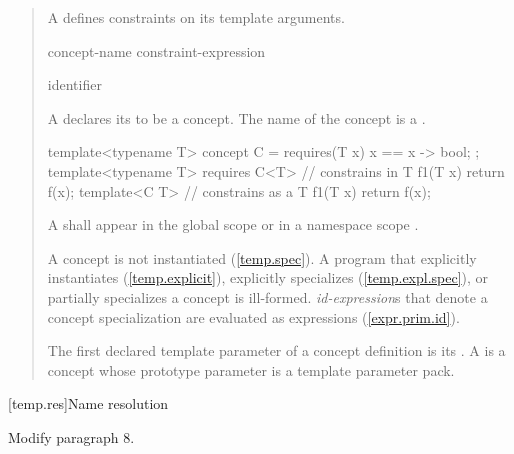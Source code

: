 \begin{quote}
\begin{addedblock}
\pnum A  defines constraints on its template arguments.

\begin{bnf}
\br
   concept-name \terminal{=} constraint-expression\br
\end{bnf}
\begin{bnf}
\br
  identifier
\end{bnf}

\pnum A  declares its 
to be a concept. The name of the concept is a .
\enterexample
\begin{codeblock}
template<typename T>
concept C = requires(T x) {
  { x == x } -> bool;
};
template<typename T> 
  requires C<T> //  constrains  in 
T f1(T x) { return f(x); }
template<C T> //  constrains  as a 
T f1(T x) { return f(x); }
\end{codeblock}
\exitexample

\pnum
A  shall appear in the global scope or in a
namespace scope .

\pnum
A concept is not instantiated (\ref{temp.spec}). 
A program that explicitly instantiates (\ref{temp.explicit}), explicitly 
specializes (\ref{temp.expl.spec}), or partially
specializes a concept is ill-formed. 
\enternote
\emph{id-expression}s that denote a concept specialization are evaluated as
expressions (\ref{expr.prim.id}).
\exitnote

\pnum
The first declared template parameter of a concept definition is its 
.
A  is a concept whose prototype parameter is a template 
parameter pack.
\end{addedblock}
\end{quote}

[temp.res]{Name resolution}

Modify paragraph 8.

